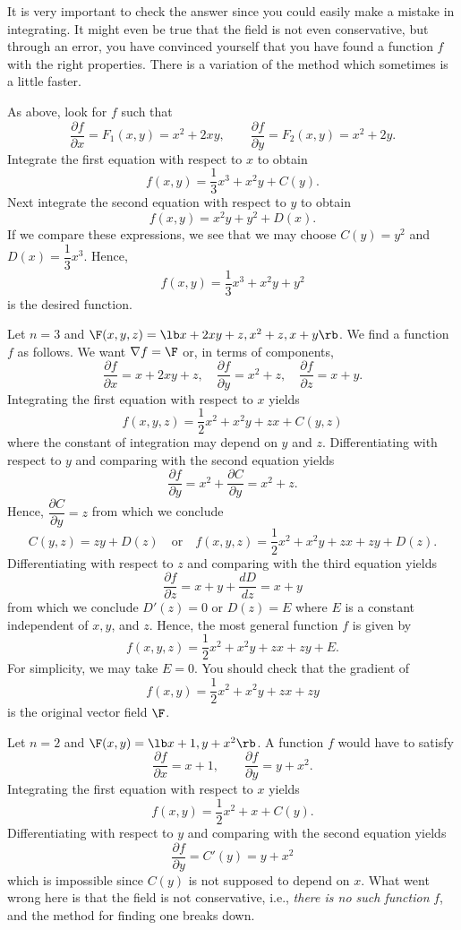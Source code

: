 It is very important to check the answer since you could easily
make a mistake in integrating.  It might even be true that the
field is not even conservative, but through an error, you have convinced
yourself that you have found a function $f$ with the right
properties.
\medskip
There is a variation of the method which sometimes is a little
faster.

As above, look for $f$ such that
$$
   \frac{\partial f}{\partial x} = F_1(x,y) = x^2 + 2xy, \qquad
   \frac{\partial f}{\partial y} = F_2(x,y) = x^2 + 2y.
$$
Integrate the first equation with respect to $x$ to obtain
$$
  f(x,y) = \frac 13 x^3 + x^2y + C(y).
$$
Next integrate the second equation with respect to $y$ to obtain
$$
  f(x,y) = x^2y + y^2 + D(x).
$$
If we compare these expressions, we see that we may choose
$C(y) = y^2$ and $D(x) = \dfrac 13 x^3$.  Hence,
$$
  f(x,y) = \frac 13 x^3 + x^2y + y^2
$$
is the desired function.
\endexample

\nextex
{}  Let $n = 3$ and $\F(x,y,z) =
\lb x + 2xy + z, x^2 + z, x + y \rb$.  We find a function $f$
 as follows.  We want $\nabla f = \F$ or, in terms of components,
$$
\frac{\partial f}{\partial x} = x + 2xy + z,\quad
\frac{\partial f}{\partial y} = x^2  + z,\quad
\frac{\partial f}{\partial z} = x + y.
$$
Integrating the first equation with respect to $x$ yields
$$
f(x,y,z) = \frac 12 x^2 + x^2y + zx + C(y,z)
$$
where the constant of integration may depend on $y$ and $z$.
Differentiating with respect to $y$ and comparing with the second
equation yields
$$
\frac{\partial f}{\partial y} = x^2 + \frac{\partial C}{\partial y}
 = x^2 +z.
$$
Hence, $\dfrac{\partial C}{\partial y} = z$ from which we conclude
$$
C(y,z) = zy + D(z)\quad\text{or}\quad f(x,y,z) = \frac 12 x^2 + x^2y
+ zx + zy + D(z).
$$
Differentiating with respect to $z$ and comparing with the third equation
yields
$$
\frac{\partial f}{\partial z} = x + y + \frac{dD}{dz} = x + y
$$
from which we conclude $D'(z) = 0$ or $D(z) = E$ where $E$ is
a constant independent of $x, y$, and $z$.  Hence, the most
general function $f$ is given by
$$
f(x,y,z) = 
 \frac 12 x^2 + x^2y
+ zx + zy + E.
$$
For simplicity, we may take $E = 0$.   You should check that the
gradient of 
$$f(x,y) = \dfrac 12 x^2 + x^2y + zx + zy$$
 is the
original vector field $\F$.
\endexample

\nextex
{}  Let $n = 2$ and $\F(x,y) = \lb x + 1, y + x^2 \rb$.
A function $f$ would have to satisfy
$$
 \frac{\partial f}{\partial x} = x + 1,\qquad
 \frac{\partial f}{\partial y} = y + x^2.
$$
Integrating the first equation with respect to $x$ yields
$$
f(x,y) = \frac 12 x^2 + x + C(y).
$$
Differentiating with respect to $y$ and comparing with the
second equation yields
$$
\frac{\partial f}{\partial y} =  C'(y) = y + x^2
$$
which is impossible since $C(y)$ is not supposed to depend on $x$.
What went wrong here is that the field is not conservative,
i.e., {\it there is  no such function\/} $f$, and the method
for finding one breaks down.
\endexample


